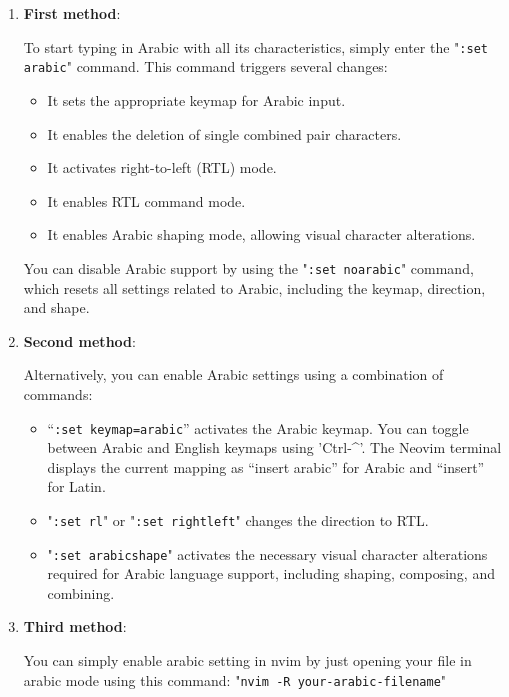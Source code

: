 \documentclass[12pt, letterpaper]{article}
\begin{document}
\begin{enumerate}
    \item \textbf{First method}:
    
    To start typing in Arabic with all its characteristics, simply enter the "\texttt{:set arabic}" command. This command triggers several changes:
    \begin{itemize}
        \item It sets the appropriate keymap for Arabic input.
        \item It enables the deletion of single combined pair characters.
        \item It activates right-to-left (RTL) mode.
        \item It enables RTL command mode.
        \item It enables Arabic shaping mode, allowing visual character alterations.
    \end{itemize}
    
    You can disable Arabic support by using the "\texttt{:set noarabic}" command, which resets all settings related to Arabic, including the keymap, direction, and shape.
    
    \item \textbf{Second method}:
    
    Alternatively, you can enable Arabic settings using a combination of commands:
    \begin{itemize}
        \item ``\texttt{:set keymap=arabic}'' activates the Arabic keymap. You can toggle between Arabic and English keymaps using 'Ctrl-\textasciicircum'. The Neovim terminal displays the current mapping as ``insert arabic'' for Arabic and ``insert'' for Latin.
        
        \item "\texttt{:set rl}" or "\texttt{:set rightleft}" changes the direction to RTL.
        \item "\texttt{:set arabicshape}" activates the necessary visual character alterations required for Arabic language support, including shaping, composing, and combining.
    \end{itemize}

    \item \textbf{Third method}:

You can simply enable arabic setting in nvim by just opening your file in arabic mode using this command: "\texttt{nvim -R your-arabic-filename}"

\end{enumerate}
\end{document}
